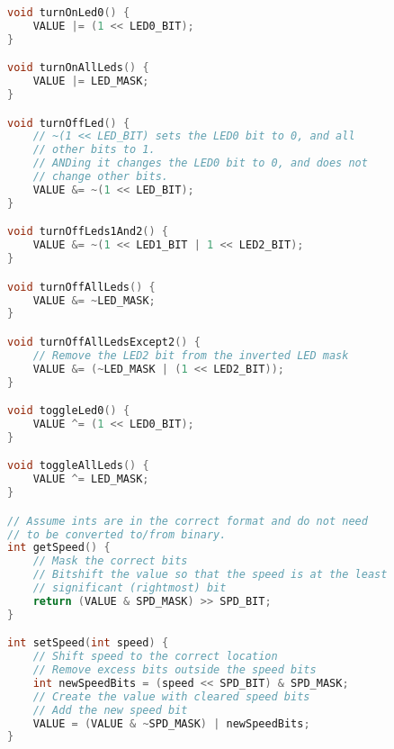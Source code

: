 \documentclass[11pt, oneside, letterpaper]{article}
\begin{document}
\begin{lstlisting}[language=C, columns=fixed]
void turnOnLed0() {
	VALUE |= (1 << LED0_BIT);
}

void turnOnAllLeds() {
	VALUE |= LED_MASK;
}

void turnOffLed() {
	// ~(1 << LED_BIT) sets the LED0 bit to 0, and all
	// other bits to 1.
	// ANDing it changes the LED0 bit to 0, and does not
	// change other bits.
	VALUE &= ~(1 << LED_BIT);
}

void turnOffLeds1And2() {
	VALUE &= ~(1 << LED1_BIT | 1 << LED2_BIT);
}

void turnOffAllLeds() {
	VALUE &= ~LED_MASK;
}

void turnOffAllLedsExcept2() {
	// Remove the LED2 bit from the inverted LED mask
	VALUE &= (~LED_MASK | (1 << LED2_BIT));
}

void toggleLed0() {
	VALUE ^= (1 << LED0_BIT);
}

void toggleAllLeds() {
	VALUE ^= LED_MASK;
}

// Assume ints are in the correct format and do not need 
// to be converted to/from binary.
int getSpeed() {
	// Mask the correct bits
	// Bitshift the value so that the speed is at the least
	// significant (rightmost) bit
	return (VALUE & SPD_MASK) >> SPD_BIT;
}

int setSpeed(int speed) {
	// Shift speed to the correct location
	// Remove excess bits outside the speed bits
	int newSpeedBits = (speed << SPD_BIT) & SPD_MASK;
	// Create the value with cleared speed bits
	// Add the new speed bit
	VALUE = (VALUE & ~SPD_MASK) | newSpeedBits;
}
\end{lstlisting}
\end{document}

